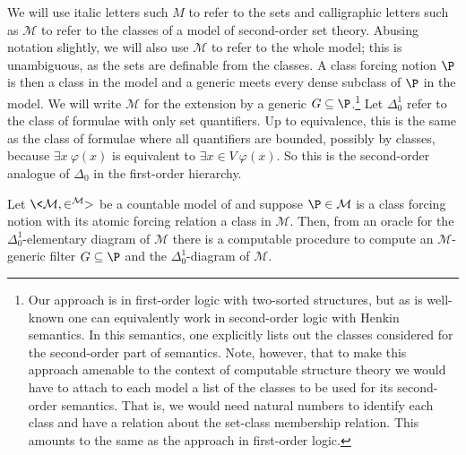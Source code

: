 \documentclass{amsart}
\begin{document}
We will use italic letters such $M$ to refer to the sets and calligraphic letters such as $\mathcal M$ to refer to the classes of a model of second-order set theory. Abusing notation slightly, we will also use $\mathcal M$ to refer to the whole model; this is unambiguous, as the sets are definable from the classes. A class forcing notion $\P$ is then a class in the model and a generic meets every dense subclass of $\P$ in the model. We will write $\mathcal M$ for the extension by a generic $G \subseteq \P$.\footnote{Our approach is in first-order logic with two-sorted structures, but as is well-known one can equivalently work in second-order logic with Henkin semantics. In this semantics, one explicitly lists out the classes considered for the second-order part of semantics. Note, however, that to make this approach amenable to the context of computable structure theory we would have to attach to each model a list of the classes to be used for its second-order semantics. That is, we would need natural numbers to identify each class and have a relation about the set-class membership relation. This amounts to the same as the approach in first-order logic.}
Let $\Delta^1_0$ refer to the class of formulae with only set quantifiers. Up to equivalence, this is the same as the class of formulae where all quantifiers are bounded, possibly by classes, because $\exists x\ \varphi(x)$ is equivalent to $\exists x \in V\ \varphi(x)$. So this is the second-order analogue of $\Delta_0$ in the first-order \Levy{} hierarchy.
\begin{theorem}\label{Theorem.Computing-first-order-diagram-for-class-forcing}
Let $\<\mathcal{M},\in^{\mathcal{M}}>$ be a countable model of \GB{} and suppose $\P \in \mathcal M$ is a class forcing notion with its atomic forcing relation a class in $\mathcal M$. Then, from an oracle for the $\Delta^1_0$-elementary diagram of $\mathcal{M}$ there is a computable procedure to compute an $\mathcal{M}$-generic filter $G \subseteq \P$ and the $\Delta^1_0$-diagram of $\mathcal{M}$.
\end{theorem}
\end{document}
